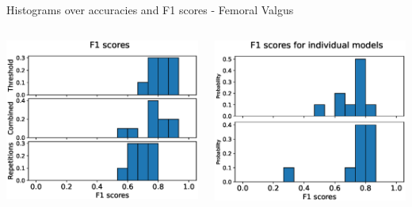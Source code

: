 \begin{frame}[fragile]{Histograms over accuracies and F1 scores - Femoral Valgus}
\begin{columns}
  \includegraphics[width=\textwidth]{files/figs/res/femval/f1.eps}

  \includegraphics[width=\textwidth]{files/figs/res/femval/f1-ind.eps}
\end{columns}
\end{frame}

